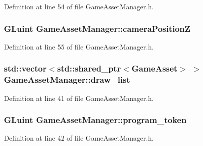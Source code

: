 Definition at line 54 of file Game\+Asset\+Manager.\+h.

\hypertarget{class_game_asset_manager_a076d00cef5f59a5038e168a0cc80420d}{}
\subsubsection[{camera\+Position\+Z}]{\setlength{\rightskip}{0pt plus 5cm}G\+Luint Game\+Asset\+Manager\+::camera\+Position\+Z\hspace{0.3cm}{\ttfamily [private]}}\label{class_game_asset_manager_a076d00cef5f59a5038e168a0cc80420d}


Definition at line 55 of file Game\+Asset\+Manager.\+h.

\hypertarget{class_game_asset_manager_a671cddd92f1de4186c582fe0c4297b7d}{}
\subsubsection[{draw\+\_\+list}]{\setlength{\rightskip}{0pt plus 5cm}std\+::vector$<$std\+::shared\+\_\+ptr$<${\bf Game\+Asset}$>$ $>$ Game\+Asset\+Manager\+::draw\+\_\+list\hspace{0.3cm}{\ttfamily [private]}}\label{class_game_asset_manager_a671cddd92f1de4186c582fe0c4297b7d}


Definition at line 41 of file Game\+Asset\+Manager.\+h.

\hypertarget{class_game_asset_manager_ad7bab17862e06ca692289f934b40548b}{}
\subsubsection[{program\+\_\+token}]{\setlength{\rightskip}{0pt plus 5cm}G\+Luint Game\+Asset\+Manager\+::program\+\_\+token\hspace{0.3cm}{\ttfamily [private]}}\label{class_game_asset_manager_ad7bab17862e06ca692289f934b40548b}


Definition at line 42 of file Game\+Asset\+Manager.\+h.

